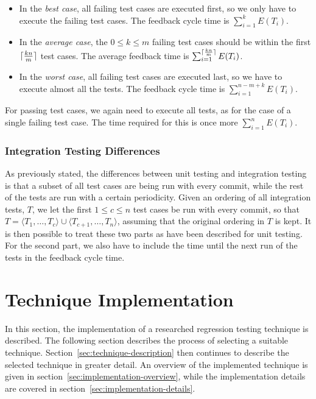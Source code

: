 \documentclass[a4paper,english,12pt]{report}
\DeclarePairedDelimiter{\ceil}{\lceil}{\rceil}
\begin{document}
\begin{itemize}
  \item In the \textit{best case}, all failing test cases are executed first, so we only have to execute the failing test cases. The feedback cycle time is $\sum_{i=1}^{k}E(T_i)$. 
  \item In the \textit{average case}, the $0 \leq k \leq m$ failing test cases should be within the first $\ceil{\frac{kn}{m}}$ test cases. The average feedback time is $\sum_{i=1}^{\ceil{\frac{kn}{m}}}E(T_i)$.
  \item In the \textit{worst case}, all failing test cases are executed last, so we have to execute almost all the tests. The feedback cycle time is $\sum_{i=1}^{n-m+k} E(T_i)$.
\end{itemize}

For passing test cases, we again need to execute all tests, as for the case of a single failing test case. The time required for this is once more $\sum_{i=1}^{n}E(T_i)$.

\subsubsection{Integration Testing Differences}
As previously stated, the differences between unit testing and integration testing is that a subset of all test cases are being run with every commit, while the rest of the tests are run with a certain periodicity. Given an ordering of all integration tests, $T$, we let the first $1 \leq c \leq n$ test cases be run with every commit, so that $T=\langle T_1, \ldots, T_c \rangle\cup\langle T_{c+1},\ldots,T_{n} \rangle$, assuming that the original ordering in $T$ is kept. It is then possible to treat these two parts as have been described for unit testing. For the second part, we also have to include the time until the next run of the tests in the feedback cycle time.

\section{Technique Implementation}\label{sec:technique-implementation}
In this section, the implementation of a researched regression testing technique is described. The following section describes the process of selecting a suitable technique. Section~\ref{sec:technique-description} then continues to describe the selected technique in greater detail. An overview of the implemented technique is given in section~\ref{sec:implementation-overview}, while the implementation details are covered in section~\ref{sec:implementation-details}.
\end{document}
